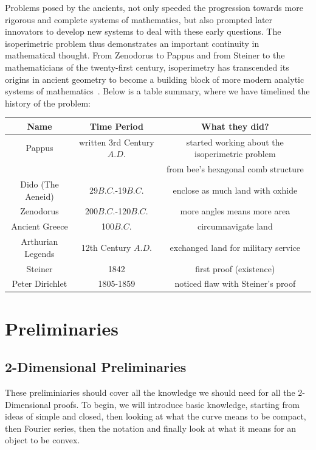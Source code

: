 \documentclass[a4paper]{book}
\numberwithin{theorem}{section}%
\begin{document}
Problems posed by the ancients, not only speeded the progression towards more rigorous and complete systems of mathematics, but also prompted later innovators to develop new systems to deal with these early questions. The isoperimetric problem thus demonstrates an important continuity in mathematical thought. From Zenodorus to Pappus and from Steiner to the mathematicians of the twenty-first century, isoperimetry has transcended its origins in ancient geometry to become a building block of more modern analytic systems of mathematics~\citep{wiegert2010sagacity}. Below is a table summary, where we have timelined the history of the problem:
\newline
\newline
\begin{center}
    \begin{tabular}{||c c c||} 
        \hline
        Name & Time Period & What they did? \\ [0.5ex] 
        \hline
        Pappus & written 3rd Century $A.D.$ & started working about the isoperimetric problem \\ && from bee's hexagonal comb structure  \\ 
        \hline
        Dido (The Aeneid) & 29$B.C.$-19$B.C.$ & enclose as much land with oxhide \\
        \hline
        Zenodorus & 200$B.C.$-120$B.C.$ & more angles means more area \\
        \hline
        Ancient Greece & 100$B.C.$ & circumnavigate land \\
        \hline
        Arthurian Legends & 12th Century $A.D.$ & exchanged land for military service \\
        \hline
        Steiner & 1842 & first proof (existence) \\ 
        \hline
        Peter Dirichlet & 1805-1859 & noticed flaw with Steiner's proof \\ [1ex]
        \hline
    \end{tabular}
\end{center}

\chapter{Preliminaries}
\section{2-Dimensional Preliminaries}
These preliminiaries should cover all the knowledge we should need for all the $2$-Dimensional proofs. To begin, we will introduce basic knowledge, starting from ideas of simple and closed, then looking at what the curve means to be compact, then Fourier series, then the notation and finally look at what it means for an object to be convex. 
\end{document}
